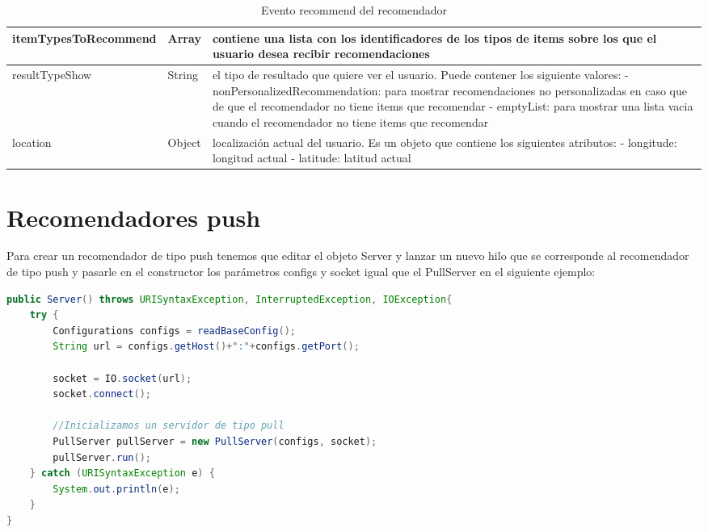 \begin{table}[H]
\begin{tabular}{|l|l|p{6cm}|}
		itemTypesToRecommend                  & Array                              & contiene una lista con los identificadores de los tipos de items sobre los que el usuario desea recibir recomendaciones                                                                                                                                                                                                                                 \\ \hline
		resultTypeShow                        & String                             & el tipo de resultado que quiere ver el usuario. Puede contener los siguiente valores: \newline - nonPersonalizedRecommendation: para mostrar recomendaciones no personalizadas en caso que de que el recomendador no tiene items que recomendar \newline - emptyList: para mostrar una lista vacia cuando el recomendador no tiene items que recomendar \\ \hline
		location                              & Object                             & localización actual del usuario. Es un objeto que contiene los siguientes atributos: \newline- longitude: longitud actual \newline - latitude: latitud actual                                                                                                                                                                                           \\ \hline
	\end{tabular}
	\caption{Evento recommend del recomendador}
\end{table}

\newpage

\section{Recomendadores push}

Para crear un recomendador de tipo push tenemos que editar el objeto Server y lanzar un nuevo hilo que se corresponde al recomendador de tipo push y pasarle en el constructor los parámetros configs y socket igual que el PullServer en el siguiente ejemplo: 

\begin{lstlisting}[language=java, frame=single]
public Server() throws URISyntaxException, InterruptedException, IOException{
	try {
		Configurations configs = readBaseConfig();
		String url = configs.getHost()+":"+configs.getPort();
		
		socket = IO.socket(url);
		socket.connect();
		
		//Inicializamos un servidor de tipo pull
		PullServer pullServer = new PullServer(configs, socket);
		pullServer.run();
	} catch (URISyntaxException e) {
		System.out.println(e);
	}
}
\end{lstlisting}

